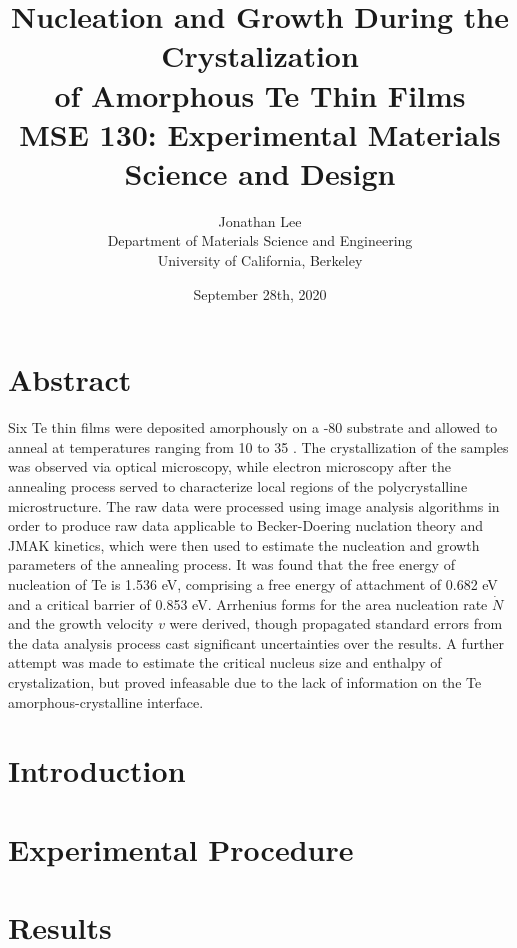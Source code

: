 \documentclass[12pt, titlepage]{article}
\title{\Large Nucleation and Growth During the Crystalization \\
		of Amorphous Te Thin Films \\
		\bigskip
	\normalsize MSE 130: Experimental Materials Science and Design}
\author{\normalsize Jonathan Lee \\
	\normalsize Department of Materials Science and Engineering \\
	\normalsize University of California, Berkeley}
\date{\normalsize September 28th, 2020}
\begin{document}
\maketitle

\doublespacing

\setcounter{page}{2}

\tableofcontents

\newpage

\section{Abstract}

Six Te thin films were deposited amorphously on a -80  substrate and allowed to anneal at temperatures ranging from 10  to 35 .  The crystallization of the samples was observed via optical microscopy, while electron microscopy after the annealing process served to characterize local regions of the polycrystalline microstructure.  The raw data were processed using image analysis algorithms in order to produce raw data applicable to Becker-Doering nuclation theory and JMAK kinetics, which were then used to estimate the nucleation and growth parameters of the annealing process.  It was found that the free energy of nucleation of Te is 1.536 eV, comprising a free energy of attachment of 0.682 eV and a critical barrier of 0.853 eV.  Arrhenius forms for the area nucleation rate $\dot{N}$ and the growth velocity $v$ were derived, though propagated standard errors from the data analysis process cast significant uncertainties over the results.  A further attempt was made to estimate the critical nucleus size and enthalpy of crystalization, but proved infeasable due to the lack of information on the Te amorphous-crystalline interface.

\section{Introduction}



\section{Experimental Procedure}



\section{Results}
\end{document}
